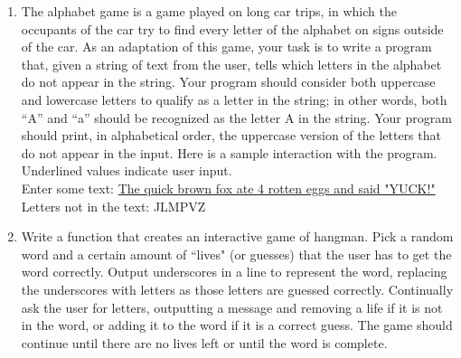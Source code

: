 \documentclass[11pt, letterpaper, onecolumn, oneside, final]{article}
\begin{document}
\begin{enumerate}
\item The alphabet game is a game played on long car trips, in which the occupants of the car try to find every letter of the alphabet on signs outside of the car. As an adaptation of this game, your task is to write a program that, given a string of text from the user, tells which letters in the alphabet do not appear in the string. Your program should consider both uppercase and lowercase letters to qualify as a letter in the string; in other words, both \textquotedblleft A” and \textquotedblleft a” should be recognized as the letter A in the string. Your program should print, in alphabetical order, the uppercase version of the letters that do not appear in the input.
Here is a sample interaction with the program. Underlined values indicate user input.\\
{\consolas Enter some text: \underline{The quick brown fox ate 4 rotten eggs and said "YUCK!"}\\ Letters not in the text: JLMPVZ}

\item Write a function that creates an interactive game of hangman. Pick a random word and a certain amount of 
\textquotedblleft lives" (or guesses) that the user has to get the word correctly. Output underscores in a line to represent the word, replacing the underscores with letters as those letters are guessed correctly. Continually ask the user for letters, outputting a message and removing a life if it is not in the word, or adding it to the word if it is a correct guess. The game should continue until there are no lives left or until the word is complete.

\end{enumerate}
\end{document}
